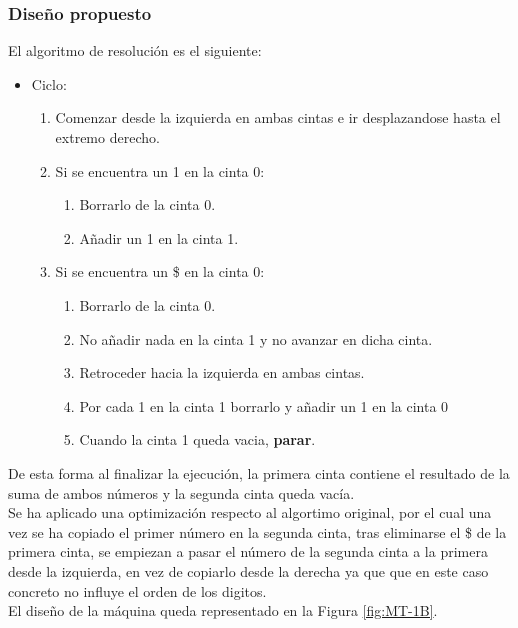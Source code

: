 \subsubsection*{Diseño propuesto}
El algoritmo de resolución es el siguiente:

\begin{itemize}
    \item Ciclo:
    \begin{enumerate}[1.]
        \item Comenzar desde la izquierda en ambas cintas e ir desplazandose hasta el extremo derecho.
        \item Si se encuentra un 1 en la cinta 0:
        \begin{enumerate}[1.]
            \item Borrarlo de la cinta 0.
            \item Añadir un 1 en la cinta 1.
        \end{enumerate}
        \item Si se encuentra un \$ en la cinta 0:
        \begin{enumerate}[1.]
            \item Borrarlo de la cinta 0.
            \item No añadir nada en la cinta 1 y no avanzar en dicha cinta.
            \item Retroceder hacia la izquierda en ambas cintas.
            \item Por cada 1 en la cinta 1 borrarlo y añadir un 1 en la cinta 0
            \item Cuando la cinta 1 queda vacia, \textbf{parar}.
        \end{enumerate}
    \end{enumerate}
\end{itemize}
De esta forma al finalizar la ejecución, la primera cinta contiene el resultado de la suma de ambos números y la segunda cinta queda vacía. \\

Se ha aplicado una optimización respecto al algortimo original, por el cual una vez se ha copiado el primer número en la segunda cinta, tras eliminarse el \$ de la primera cinta, se empiezan a pasar el número de la segunda cinta a la primera desde la izquierda, en vez de copiarlo desde la derecha ya que que en este caso concreto no influye el orden de los digitos.\\

El diseño de la máquina queda representado en la Figura \ref{fig:MT-1B}.

